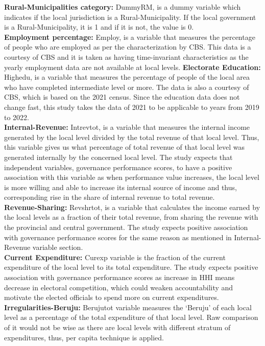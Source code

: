 \textbf{Rural-Municipalities category:} DummyRM, is a dummy variable which indicates if the local jurisdiction is a Rural-Municipality. If the local government is a Rural-Municipality, it is 1 and if it is not, the value is 0.\\
\textbf{Employment percentage:} Employ, is a variable that measures the percentage of people who are employed as per the characterization by CBS. This data is a courtesy of CBS and it is taken as having time-invariant characteristics as the yearly employment data are not available at local levels.
\textbf{Electorate Education:} Highedu, is a variable that measures the percentage of people of the local area who have completed intermediate level or more. The data is also a courtesy of CBS, which is based on the 2021 census. Since the education data does not change fast, this study takes the data of 2021 to be applicable to years from 2019 to 2022. \\
\textbf{Internal-Revenue:} Intrevtot, is a variable that measures the internal income generated by the local level divided by the total revenue of that local level. Thus, this variable gives us what percentage of total revenue of that local level was generated internally by the concerned local level. The study expects that independent variables, governance performance scores, to have a positive association with this variable as when performance value increases, the local level is more willing and able to increase its internal source of income and thus, corresponding rise in the share of internal revenue to total revenue.\\
\textbf{Revenue-Sharing:} Revshrtot, is a variable that calculates the income earned by the local levels as a fraction of their total revenue, from sharing the revenue with the provincial and central government. The study expects positive association with governance performance scores for the same reason as mentioned in Internal-Revenue variable section.\\
\textbf{Current Expenditure:} Curexp variable is the fraction of the current expenditure of the local level to its total expenditure. The study expects positive association with governance performance scores as increase in HHI means decrease in electoral competition, which could weaken accountability and motivate the elected officials to spend more on current expenditures.\\
\textbf{Irregularities-Beruju:} Berujutot variable measures the `Beruju' of each local level as a percentage of the total expenditure of that local level. Raw comparison of it would not be wise as there are local levels with different stratum of expenditures, thus, per capita technique is applied. 
\vspace{-3mm}
